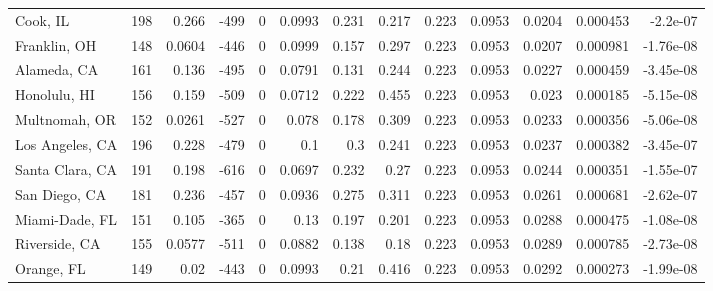 \documentclass[12pt,letterpaper]{article}
\begin{document}
{\begin{appendices}
\begin{sidewaystable}
{\begin{tabular}{lrrrrrrrrrrrr}
 Cook, IL           & 198   & 0.266   & -499   &     0 &          0.0993 &           0.231  &         0.217  &              0.223 &             0.0953 &           0.0204  &        0.000453 &       -2.2e-07   \\
 Franklin, OH       & 148   & 0.0604  & -446   &     0 &          0.0999 &           0.157  &         0.297  &              0.223 &             0.0953 &           0.0207  &        0.000981 &       -1.76e-08  \\
 Alameda, CA        & 161   & 0.136   & -495   &     0 &          0.0791 &           0.131  &         0.244  &              0.223 &             0.0953 &           0.0227  &        0.000459 &       -3.45e-08  \\
 Honolulu, HI       & 156   & 0.159   & -509   &     0 &          0.0712 &           0.222  &         0.455  &              0.223 &             0.0953 &           0.023   &        0.000185 &       -5.15e-08  \\
 Multnomah, OR      & 152   & 0.0261  & -527   &     0 &          0.078  &           0.178  &         0.309  &              0.223 &             0.0953 &           0.0233  &        0.000356 &       -5.06e-08  \\
 Los Angeles, CA    & 196   & 0.228   & -479   &     0 &          0.1    &           0.3    &         0.241  &              0.223 &             0.0953 &           0.0237  &        0.000382 &       -3.45e-07  \\
 Santa Clara, CA    & 191   & 0.198   & -616   &     0 &          0.0697 &           0.232  &         0.27   &              0.223 &             0.0953 &           0.0244  &        0.000351 &       -1.55e-07  \\
 San Diego, CA      & 181   & 0.236   & -457   &     0 &          0.0936 &           0.275  &         0.311  &              0.223 &             0.0953 &           0.0261  &        0.000681 &       -2.62e-07  \\
 Miami-Dade, FL     & 151   & 0.105   & -365   &     0 &          0.13   &           0.197  &         0.201  &              0.223 &             0.0953 &           0.0288  &        0.000475 &       -1.08e-08  \\
 Riverside, CA      & 155   & 0.0577  & -511   &     0 &          0.0882 &           0.138  &         0.18   &              0.223 &             0.0953 &           0.0289  &        0.000785 &       -2.73e-08  \\
 Orange, FL         & 149   & 0.02    & -443   &     0 &          0.0993 &           0.21   &         0.416  &              0.223 &             0.0953 &           0.0292  &        0.000273 &       -1.99e-08  \\

\end{tabular}}
\end{sidewaystable}
\end{appendices}}
\end{document}
